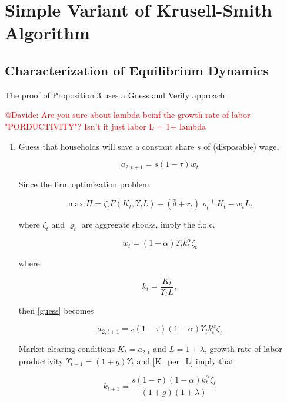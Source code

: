 \documentclass[12pt,a4paper]{article}
\begin{document}
\newpage

\section{Simple Variant of Krusell-Smith Algorithm}

\subsection{Characterization of Equilibrium Dynamics}

The proof of Proposition 3 uses a Guess and Verify approach:

\textcolor{red}{@Davide: Are you sure about lambda beinf the growth rate of labor "PORDUCTIVITY"? Isn't it just labor L = 1+ lambda}

\begin{enumerate}

  \item Guess that households will save a constant share $s$ of (disposable) wage,

    \begin{equation}
      a_{2,t+1} = s(1-\tau)w_t
    \label{guess}
    \end{equation}

  Since the firm optimization problem

    \[
      \max \Pi = \zeta_t F(K_t, \Upsilon_t L) - (\bar{\delta} + r_t)\varrho_t^{-1} K_t - w_t L,
    \]

  where $\zeta_t$ and $\varrho_t$ are aggregate shocks, imply the f.o.c.

    \[
      w_{t} = (1-\alpha)\Upsilon_t k_t^\alpha \zeta_t
    \]

  where

    \begin{equation}
        k_t = \frac{K_t}{\Upsilon_t L},
        \label{K_per_L}
    \end{equation}

  then \ref{guess} becomes

    \begin{equation}
        a_{2,t+1} = s(1-\tau)(1-\alpha)\Upsilon_t k_t^\alpha \zeta_t
    \label{a_guess}
    \end{equation}

  Market clearing conditions $K_t = a_{2,t}$ and $L = 1 + \lambda$, growth rate of labor productivity $\Upsilon_{t+1} = (1+g)\Upsilon_{t}$  and \ref{K_per_L} imply that

    \begin{equation}
        k_{t+1} = \frac{s(1-\tau)(1-\alpha) k_t^\alpha \zeta_t}{(1 + g)(1 + \lambda)}
        \label{K_guess}
    \end{equation}


\end{enumerate}
\end{document}
